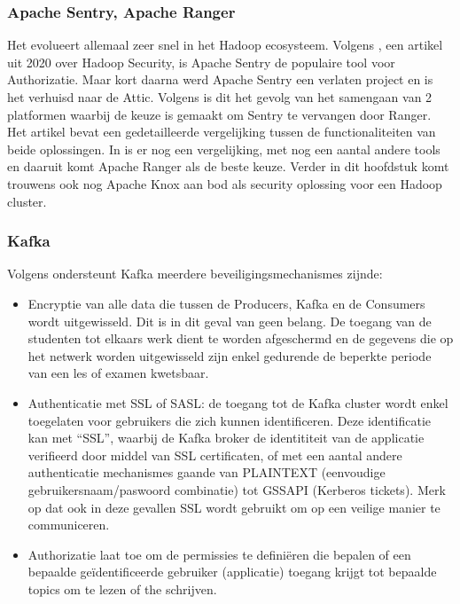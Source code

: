 \subsubsection{Apache Sentry, Apache Ranger}
Het evolueert allemaal zeer snel in het Hadoop ecosysteem. Volgens \textcite{Chu2020}, een artikel uit 2020 over Hadoop Security, is Apache Sentry de populaire tool voor Authorizatie. Maar kort daarna werd Apache Sentry een verlaten project en is het verhuisd naar de Attic.
\newline
Volgens \textcite{Anand2021} is dit het gevolg van het samengaan van 2 platformen waarbij de keuze is gemaakt om Sentry te vervangen door Ranger. Het artikel bevat een gedetailleerde vergelijking tussen de functionaliteiten van beide oplossingen.
\newline
In \textcite{Soo2020} is er nog een vergelijking, met nog een aantal andere tools en daaruit komt Apache Ranger als de beste keuze.
Verder in dit hoofdstuk komt trouwens ook nog Apache Knox aan bod als security oplossing voor een Hadoop cluster.

\subsubsection {Kafka}
Volgens \textcite{Maarek2018} ondersteunt Kafka meerdere beveiligingsmechanismes zijnde:
\begin{itemize}
    \item Encryptie van alle data die tussen de Producers, Kafka en de Consumers wordt uitgewisseld. Dit is in dit geval van geen belang. De toegang van de studenten tot elkaars werk dient te worden afgeschermd en de gegevens die op het netwerk worden uitgewisseld zijn enkel gedurende de beperkte periode van een les of examen kwetsbaar.
    \item Authenticatie met SSL of SASL: de toegang tot de Kafka cluster wordt enkel toegelaten voor gebruikers die zich kunnen identificeren. Deze identificatie kan met ``SSL'', waarbij de Kafka broker de identititeit van de applicatie verifieerd door middel van SSL certificaten, of met een aantal andere authenticatie mechanismes gaande van PLAINTEXT (eenvoudige gebruikersnaam/paswoord combinatie) tot GSSAPI (Kerberos tickets). Merk op dat ook in deze gevallen SSL wordt gebruikt om op een veilige manier te communiceren.
    \item Authorizatie laat toe om de permissies te definiëren die bepalen of een bepaalde geïdentificeerde gebruiker (applicatie) toegang krijgt tot bepaalde topics om te lezen of the schrijven.
\end{itemize}

